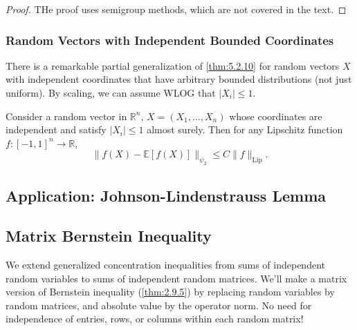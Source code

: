 \begin{proof}
THe proof uses semigroup methods, which are not covered in the text.
\end{proof}


\subsubsection{Random Vectors with Independent Bounded Coordinates}
There is a remarkable partial generalization of \cref{thm:5.2.10} for random vectors $X$ with independent 
coordinates that have arbitrary bounded distributions (not just uniform). By scaling, we can assume WLOG that 
$|X_i| \leq 1$.

\begin{theorem}
\label{thm:5.2.12}
Consider a random vector in $\mathbb{R}^n$, 
$X = (X_1, \dots, X_n)$ whose coordinates are independent and satisfy $|X_i| \leq 1$ 
almost surely. Then for any Lipschitz function $f: [-1, 1]^n \to \mathbb{R}$, 
\[ \lVert f(X) - \mathbb{E}[f(X)] \rVert_{\psi_2} \leq C \lVert f \rVert_{\mathrm{Lip}}. \]
\end{theorem}



\subsection{Application: Johnson-Lindenstrauss Lemma}



\subsection{Matrix Bernstein Inequality}
We extend generalized concentration inequalities from sums of independent random variables to sums of 
independent random matrices. We'll make a matrix version of Bernstein inequality (\cref{thm:2.9.5}) by 
replacing random variables by random matrices, and absolute value by the operator norm. No need for 
independence of entries, rows, or columns within each random matrix!

